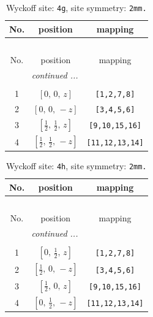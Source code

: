 \documentclass[fleqn,8pt]{jsarticle}
\begin{document}
\renewcommand{\arraystretch}{1.2}
\begin{longtable}{ccc}
\caption{Wyckoff site: {\tt 4g}, site symmetry: {\tt 2mm.}}
 \\
 \hline \hline
No. & position & mapping \\ \hline \endfirsthead

\multicolumn{2}{l}{\tablename\ \thetable{}} \\
 \hline \hline
No. & position & mapping \\ \hline \endhead

 \hline \hline
\multicolumn{2}{r}{\footnotesize\it continued ...} \\ \endfoot

 \hline \hline
\multicolumn{2}{r}{} \\ \endlastfoot

1 & $\left[ 0,\, 0,\, z \right]$ & {\tt [1,2,7,8]} \\ \hline
2 & $\left[ 0,\, 0,\, - z \right]$ & {\tt [3,4,5,6]} \\ \hline
3 & $\left[ \frac{1}{2},\, \frac{1}{2},\, z \right]$ & {\tt [9,10,15,16]} \\ \hline
4 & $\left[ \frac{1}{2},\, \frac{1}{2},\, - z \right]$ & {\tt [11,12,13,14]} \\
\end{longtable}
\renewcommand{\arraystretch}{1.2}
\begin{longtable}{ccc}
\caption{Wyckoff site: {\tt 4h}, site symmetry: {\tt 2mm.}}
 \\
 \hline \hline
No. & position & mapping \\ \hline \endfirsthead

\multicolumn{2}{l}{\tablename\ \thetable{}} \\
 \hline \hline
No. & position & mapping \\ \hline \endhead

 \hline \hline
\multicolumn{2}{r}{\footnotesize\it continued ...} \\ \endfoot

 \hline \hline
\multicolumn{2}{r}{} \\ \endlastfoot

1 & $\left[ 0,\, \frac{1}{2},\, z \right]$ & {\tt [1,2,7,8]} \\ \hline
2 & $\left[ \frac{1}{2},\, 0,\, - z \right]$ & {\tt [3,4,5,6]} \\ \hline
3 & $\left[ \frac{1}{2},\, 0,\, z \right]$ & {\tt [9,10,15,16]} \\ \hline
4 & $\left[ 0,\, \frac{1}{2},\, - z \right]$ & {\tt [11,12,13,14]} \\
\end{longtable}
\end{document}
